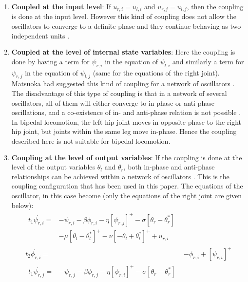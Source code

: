 \documentclass[12pt,twoside]{article}
\theoremstyle{plain}
\theoremstyle{definition}
\theoremstyle{remark}
\begin{document}
\begin{enumerate}
\item \textbf{Coupled at the input level}: If $u_{r,i}=u_{l,i}$ and $u_{r,j}=u_{l,j}$, then the coupling is done at the input level. However this kind of coupling does not allow the oscillators to converge to a definite phase and they continue behaving as two independent units \cite{Ronsse2009}.
\item \textbf{Coupled at the level of internal state variables}: Here the coupling is done by having a term for $\psi_{r,i}$ in the equation of $\psi_{l,i}$ and similarly a term for $\psi_{r,j}$ in the equation of $\psi_{l,j}$ (same for the equations of the right joint). Matsuoka had suggested this kind of coupling for a network of oscillators \cite{Matsuoka1987}. The disadvantage of this type of coupling is that in a network of several oscillators, all of them will either converge to in-phase or anti-phase oscillations, and a co-existence of in- and anti-phase relation is not possible \cite{Ronsse2009}. In bipedal locomotion, the left hip joint moves in opposite phase to the right hip joint, but joints within the same leg move in-phase. Hence the coupling described here is not suitable for bipedal locomotion.
\item \textbf{Coupling at the level of output variables}: If the coupling is done at the level of the output variables $\theta_l$ and $\theta_r$, both in-phase and anti-phase relationships can be achieved within a network of oscillators \cite{Ronsse2009}. This is the coupling configuration that has been used in this paper. The equations of the oscillator, in this case become (only the equations of the right joint are given below):\\
\begin{subequations}
\label{eq:matsuoka_coupled}
%
\begin{align}
\label{eq:matsuoka_coupled1}
\begin{split}
t_1 \dot{\psi_{r,i}}={}& -\psi_{r,i} - \beta \phi_{r,i} - \eta [\psi_{r,j}]^+ - \sigma [\theta_r - \theta^{*}_r]\\ 
& - \mu [\theta_l - \theta_l^*]^+ - \nu [-\theta_l + \theta_l^*]^+ + u_{r,i} 
\end{split}
\\
%
\label{eq:matsuoka_coupled2}
t_2 \dot{\phi_{r,i}} = {}& -\phi_{r,i} + [\psi_{r,i}]^+
\\
%
\label{eq:matsuoka_coupled3}
\begin{split}
t_1 \dot{\psi_{r,j}}={}& -\psi_{r,j} - \beta \phi_{r,j} - \eta [\psi_{r,i}]^+ - \sigma [\theta_r - \theta^{*}_r]\\

\end{split}
\end{align}
\end{subequations}
\end{enumerate}
\end{document}
